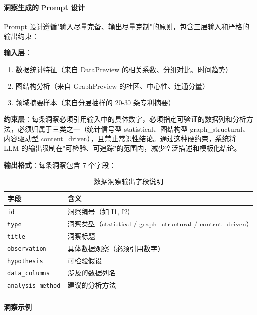 \paragraph{洞察生成的 Prompt 设计}

Prompt 设计遵循"输入尽量完备、输出尽量克制"的原则，包含三层输入和严格的输出约束：

\textbf{输入层}：

\begin{enumerate}
\item 数据统计特征（来自 DataPreview 的相关系数、分组对比、时间趋势）
\item 图结构分析（来自 GraphPreview 的社区、中心性、连通分量）
\item 领域摘要样本（来自分层抽样的 20-30 条专利摘要）
\end{enumerate}

\noindent\textbf{约束层}：每条洞察必须引用输入中的具体数字，必须指定可验证的数据列和分析方法，必须归属于三类之一（统计信号型 statistical、图结构型 graph\_structural、内容驱动型 content\_driven），且禁止常识性结论。通过这种硬约束，系统将 LLM 的输出限制在"可检验、可追踪"的范围内，减少空泛描述和模板化结论。

\noindent\textbf{输出格式}：每条洞察包含 7 个字段：

\begin{table}[htbp]
\centering
\caption{数据洞察输出字段说明}
\label{tab:insight-fields}
\begin{tabular}{@{}lp{10cm}@{}} %
\toprule
字段 & 含义 \\ \midrule
\texttt{id} & 洞察编号（如 I1, I2） \\
\texttt{type} & 洞察类型（statistical / graph\_structural / content\_driven） \\
\texttt{title} & 洞察标题 \\
\texttt{observation} & 具体数据观察（必须引用数字） \\
\texttt{hypothesis} & 可检验假设 \\
\texttt{data\_columns} & 涉及的数据列名 \\
\texttt{analysis\_method} & 建议的分析方法 \\ \bottomrule
\end{tabular}
\end{table}

\paragraph{洞察示例}

